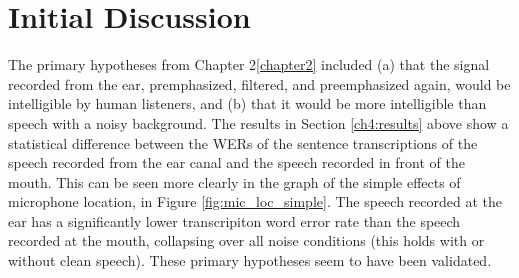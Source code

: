 \documentclass[dissertation,copyright]{uathesis}
\begin{document}
\section{Initial Discussion}



The primary hypotheses from Chapter 2\ref{chapter2} included (a) that the signal recorded from the ear, premphasized, filtered, and preemphasized again, would be intelligible by human listeners, and (b) that it would be more intelligible than speech with a noisy background.  The results in Section \ref{ch4:results} above show a statistical difference between the WERs of the sentence transcriptions of the speech recorded from the ear canal and the speech recorded in front of the mouth.  This can be seen more clearly in the graph of the simple effects of microphone location, in Figure \ref{fig:mic_loc_simple}.  The speech recorded at the ear has a significantly lower transcripiton word error rate than the speech recorded at the mouth, collapsing over all noise conditions (this holds with or without clean speech). These primary hypotheses seem to have been validated.
\end{document}
